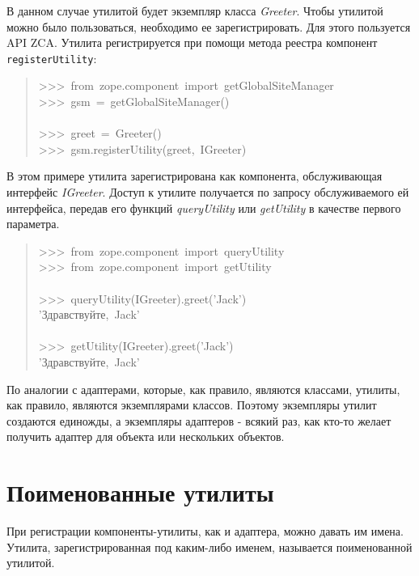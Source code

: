 \documentclass[a4paper,openany,twoside,final]{book}
\providecommand*{\DUroletitlereference}[1]{\textsl{#1}}
\begin{document}
В данном случае утилитой будет экземпляр класса \DUroletitlereference{Greeter}.  Чтобы
утилитой можно было пользоваться, необходимо ее зарегистрировать.  Для
этого пользуется API ZCA.  Утилита регистрируется при помощи метода
реестра компонент \texttt{registerUtility}:

\begin{quote}{\ttfamily \raggedright \noindent
>{}>{}>~from~zope.component~import~getGlobalSiteManager\\
>{}>{}>~gsm~=~getGlobalSiteManager()\\
~\\
>{}>{}>~greet~=~Greeter()\\
>{}>{}>~gsm.registerUtility(greet,~IGreeter)
}
\end{quote}

В этом примере утилита зарегистрирована как компонента, обслуживающая
интерфейс \DUroletitlereference{IGreeter}.  Доступ к утилите получается по запросу
обслуживаемого ей интерфейса, передав его функций \DUroletitlereference{queryUtility} или
\DUroletitlereference{getUtility} в качестве первого параметра.

\begin{quote}{\ttfamily \raggedright \noindent
>{}>{}>~from~zope.component~import~queryUtility\\
>{}>{}>~from~zope.component~import~getUtility\\
~\\
>{}>{}>~queryUtility(IGreeter).greet('Jack')\\
'Здравствуйте,~Jack'\\
~\\
>{}>{}>~getUtility(IGreeter).greet('Jack')\\
'Здравствуйте,~Jack'
}
\end{quote}

По аналогии с адаптерами, которые, как правило, являются классами,
утилиты, как правило, являются экземплярами классов.  Поэтому
экземпляры утилит создаются единожды, а экземпляры адаптеров - всякий
раз, как кто-то желает получить адаптер для объекта или нескольких
объектов.


\section{Поименованные утилиты%
  \label{id42}%
}

При регистрации компоненты-утилиты, как и адаптера, можно давать им
имена.  Утилита, зарегистрированная под каким-либо именем, называется
поименованной утилитой.
\end{document}

